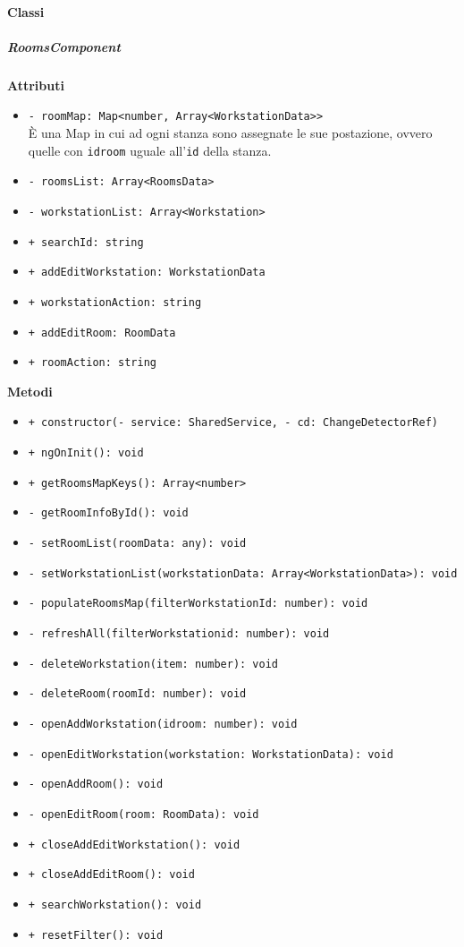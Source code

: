 \paragraph{Classi}
\subparagraph{RoomsComponent}
\textbf{Attributi}
\begin{itemize}
	\item \texttt{- roomMap: Map<number, Array<WorkstationData>>} \\
		È una Map in cui ad ogni stanza sono assegnate le sue postazione, ovvero quelle con \texttt{idroom} uguale all'\texttt{id} della stanza.
	\item \texttt{- roomsList: Array<RoomsData>} 
	\item \texttt{- workstationList: Array<Workstation>} 
	\item \texttt{+ searchId: string} 
	\item \texttt{+ addEditWorkstation: WorkstationData} 
	\item \texttt{+ workstationAction: string} 
	\item \texttt{+ addEditRoom: RoomData} 
	\item \texttt{+ roomAction: string} 
\end{itemize}
\textbf{Metodi}
\begin{itemize}
	\item \texttt{+ constructor(- service: SharedService, - cd: ChangeDetectorRef)} 
	\item \texttt{+ ngOnInit(): void} 
	\item \texttt{+ getRoomsMapKeys(): Array<number>} 
	\item \texttt{- getRoomInfoById(): void} 
	\item \texttt{- setRoomList(roomData: any): void} 
	\item \texttt{- setWorkstationList(workstationData: Array<WorkstationData>): void} 
	\item \texttt{- populateRoomsMap(filterWorkstationId: number): void} 
	\item \texttt{- refreshAll(filterWorkstationid: number): void} 
	\item \texttt{- deleteWorkstation(item: number): void} 
	\item \texttt{- deleteRoom(roomId: number): void} 
	\item \texttt{- openAddWorkstation(idroom: number): void} 
	\item \texttt{- openEditWorkstation(workstation: WorkstationData): void} 
	\item \texttt{- openAddRoom(): void} 
	\item \texttt{- openEditRoom(room: RoomData): void} 
	\item \texttt{+ closeAddEditWorkstation(): void} 
	\item \texttt{+ closeAddEditRoom(): void} 
	\item \texttt{+ searchWorkstation(): void} 
	\item \texttt{+ resetFilter(): void} 
\end{itemize}
	
